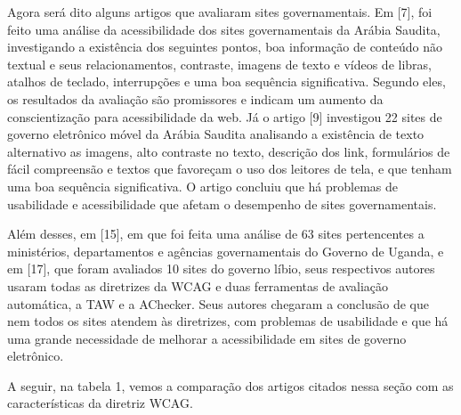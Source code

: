 \documentclass[a4paper]{article}
\begin{document}
\begin{titlepage}
Agora será dito alguns artigos que avaliaram sites governamentais. Em [7], foi feito uma análise da acessibilidade dos sites governamentais da Arábia Saudita, investigando a existência dos seguintes pontos, boa informação de conteúdo não textual e seus relacionamentos, contraste, imagens de texto e vídeos de libras, atalhos de teclado, interrupções e uma boa sequência significativa. Segundo eles, os resultados da avaliação são promissores e indicam um aumento da conscientização para acessibilidade da web. Já o artigo [9] investigou 22 sites de governo eletrônico móvel da Arábia Saudita analisando a existência de texto alternativo as imagens, alto contraste no texto, descrição dos link, formulários de fácil compreensão e textos que favoreçam o uso dos leitores de tela, e que tenham uma boa sequência significativa. O artigo concluiu que há problemas de usabilidade e acessibilidade que afetam o desempenho de sites governamentais.

Além desses, em [15], em que foi feita uma análise de 63 sites pertencentes a ministérios, departamentos e agências governamentais do Governo de Uganda, e em [17], que foram avaliados 10 sites do governo líbio, seus respectivos autores usaram todas as diretrizes da WCAG e duas ferramentas de avaliação automática, a TAW e a AChecker. Seus autores chegaram a conclusão de que nem todos os sites atendem às diretrizes, com problemas de usabilidade e que há uma grande necessidade de melhorar a acessibilidade em sites de governo eletrônico.

A seguir, na tabela 1, vemos a comparação dos artigos citados nessa seção com as características da diretriz WCAG.


\end{titlepage}
\end{document}
